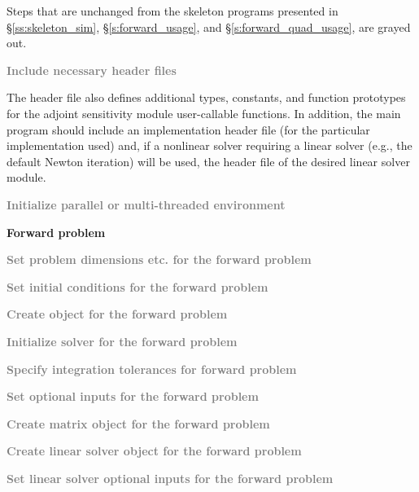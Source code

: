 Steps that are unchanged from the skeleton programs presented in
\S\ref{ss:skeleton_sim}, \S\ref{s:forward_usage}, and
\S\ref{s:forward_quad_usage}, are grayed out.

\begin{Steps}

\item
  \textcolor{gray}{\bf Include necessary header files}

  The  header file also defines additional types, constants, and
  function prototypes for the adjoint sensitivity module user-callable functions.
  In addition, the main program should include an {\nvector} implementation
  header file (for the particular implementation used) and, if a nonlinear
  solver requiring a linear solver (e.g., the default Newton iteration) will be
  used, the header file of the desired linear solver module.

\item
  \textcolor{gray}{\bf Initialize parallel or multi-threaded environment}

  \vspace{0.2in}\centerline{\bf Forward problem}

\item
  \textcolor{gray}{\bf Set problem dimensions etc. for the forward problem}

\item
  \textcolor{gray}{\bf Set initial conditions for the forward problem}

\item
  \textcolor{gray}{\bf Create {\idas} object for the forward problem}

\item
  \textcolor{gray}{\bf Initialize {\idas} solver for the forward problem}

\item
  \textcolor{gray}{\bf Specify integration tolerances for forward problem}

\item
  \textcolor{gray}{\bf Set optional inputs for the forward problem}

\item
  \textcolor{gray}{\bf Create matrix object for the forward problem}

\item
  \textcolor{gray}{\bf Create linear solver object for the forward problem}

\item
  \textcolor{gray}{\bf Set linear solver optional inputs for the forward problem}


\end{Steps}
